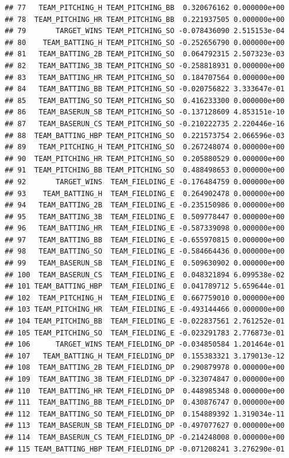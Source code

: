 \documentclass[
]{article}
\begin{document}
\begin{verbatim}
## 77   TEAM_PITCHING_H TEAM_PITCHING_BB  0.320676162 0.000000e+00
## 78  TEAM_PITCHING_HR TEAM_PITCHING_BB  0.221937505 0.000000e+00
## 79       TARGET_WINS TEAM_PITCHING_SO -0.078436090 2.515153e-04
## 80    TEAM_BATTING_H TEAM_PITCHING_SO -0.252656790 0.000000e+00
## 81   TEAM_BATTING_2B TEAM_PITCHING_SO  0.064792315 2.507323e-03
## 82   TEAM_BATTING_3B TEAM_PITCHING_SO -0.258818931 0.000000e+00
## 83   TEAM_BATTING_HR TEAM_PITCHING_SO  0.184707564 0.000000e+00
## 84   TEAM_BATTING_BB TEAM_PITCHING_SO -0.020756822 3.333647e-01
## 85   TEAM_BATTING_SO TEAM_PITCHING_SO  0.416233300 0.000000e+00
## 86   TEAM_BASERUN_SB TEAM_PITCHING_SO -0.137128609 4.853151e-10
## 87   TEAM_BASERUN_CS TEAM_PITCHING_SO -0.210222735 2.220446e-16
## 88  TEAM_BATTING_HBP TEAM_PITCHING_SO  0.221573754 2.066596e-03
## 89   TEAM_PITCHING_H TEAM_PITCHING_SO  0.267248074 0.000000e+00
## 90  TEAM_PITCHING_HR TEAM_PITCHING_SO  0.205880529 0.000000e+00
## 91  TEAM_PITCHING_BB TEAM_PITCHING_SO  0.488498653 0.000000e+00
## 92       TARGET_WINS  TEAM_FIELDING_E -0.176484759 0.000000e+00
## 93    TEAM_BATTING_H  TEAM_FIELDING_E  0.264902478 0.000000e+00
## 94   TEAM_BATTING_2B  TEAM_FIELDING_E -0.235150986 0.000000e+00
## 95   TEAM_BATTING_3B  TEAM_FIELDING_E  0.509778447 0.000000e+00
## 96   TEAM_BATTING_HR  TEAM_FIELDING_E -0.587339098 0.000000e+00
## 97   TEAM_BATTING_BB  TEAM_FIELDING_E -0.655970815 0.000000e+00
## 98   TEAM_BATTING_SO  TEAM_FIELDING_E -0.584664436 0.000000e+00
## 99   TEAM_BASERUN_SB  TEAM_FIELDING_E  0.509630902 0.000000e+00
## 100  TEAM_BASERUN_CS  TEAM_FIELDING_E  0.048321894 6.099538e-02
## 101 TEAM_BATTING_HBP  TEAM_FIELDING_E  0.041789712 5.659644e-01
## 102  TEAM_PITCHING_H  TEAM_FIELDING_E  0.667759010 0.000000e+00
## 103 TEAM_PITCHING_HR  TEAM_FIELDING_E -0.493144466 0.000000e+00
## 104 TEAM_PITCHING_BB  TEAM_FIELDING_E -0.022837561 2.761252e-01
## 105 TEAM_PITCHING_SO  TEAM_FIELDING_E -0.023291783 2.776873e-01
## 106      TARGET_WINS TEAM_FIELDING_DP -0.034850584 1.201464e-01
## 107   TEAM_BATTING_H TEAM_FIELDING_DP  0.155383321 3.179013e-12
## 108  TEAM_BATTING_2B TEAM_FIELDING_DP  0.290879978 0.000000e+00
## 109  TEAM_BATTING_3B TEAM_FIELDING_DP -0.323074847 0.000000e+00
## 110  TEAM_BATTING_HR TEAM_FIELDING_DP  0.448985348 0.000000e+00
## 111  TEAM_BATTING_BB TEAM_FIELDING_DP  0.430876747 0.000000e+00
## 112  TEAM_BATTING_SO TEAM_FIELDING_DP  0.154889392 1.319034e-11
## 113  TEAM_BASERUN_SB TEAM_FIELDING_DP -0.497077627 0.000000e+00
## 114  TEAM_BASERUN_CS TEAM_FIELDING_DP -0.214248008 0.000000e+00
## 115 TEAM_BATTING_HBP TEAM_FIELDING_DP -0.071208241 3.276290e-01

\end{verbatim}
\end{document}
